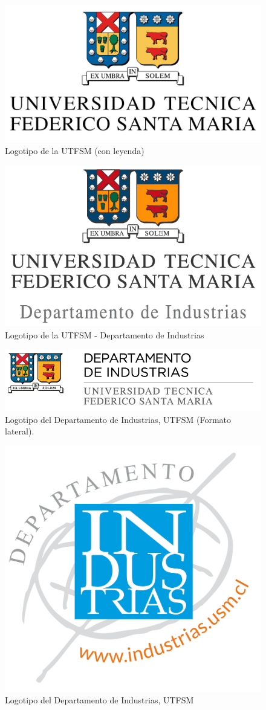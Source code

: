 \begin{figure}[ht!]
\centering
\includegraphics[scale = .45]{figures/logousmleyenda.png}
\caption{Logotipo de la UTFSM (con leyenda)}
\label{fig:logousmleyenda}
\end{figure}


\begin{figure}[ht!]
\centering
\includegraphics[scale = .75]{figures/logousmind.jpg}
\caption{Logotipo de la UTFSM - Departamento de Industrias}
\label{fig:logousmind}
\end{figure}

\begin{figure}[ht!]
    \centering
    \includegraphics[width=.8\textwidth]{figures/logo_utfsm_di.png}
    \caption{Logotipo del Departamento de Industrias, UTFSM (Formato lateral).}
    \label{fig:logodiutfsm}
\end{figure}

\begin{figure}[ht!]
\centering
\includegraphics[width=.3\textwidth]{figures/logoind.png}
\caption{Logotipo del Departamento de Industrias, UTFSM }
\label{fig:logoind1}
\end{figure}

